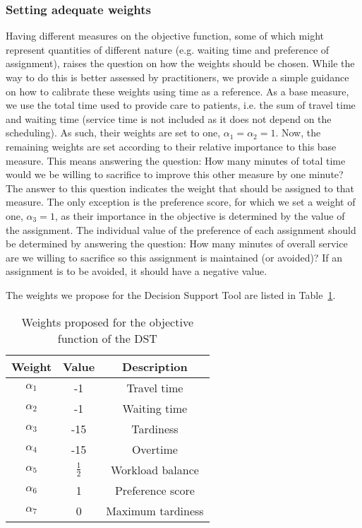 \documentclass[a4paper,11pt,authoryear]{elsarticle}
\begin{document}
\subsubsection{Setting adequate weights}
\label{subsub:adequateweights}
\noindent Having different measures on the objective function, some of which might represent quantities of different nature (e.g. waiting time and preference of assignment), raises the question on how the weights should be chosen. While the way to do this is better assessed by practitioners, we provide a simple guidance on how to calibrate these weights using time as a reference.
As a base measure, we use the total time used to provide care to patients, i.e. the sum of travel time and waiting time (service time is not included as it does not depend on the scheduling). As such, their weights are set to one, $\alpha_1 = \alpha_2 = 1$.
Now, the remaining weights are set according to their relative importance to this base measure. This means answering the question: How many minutes of total time would we be willing to sacrifice to improve this other measure by one minute? The answer to this question indicates the weight that should be assigned to that measure.
The only exception is the preference score, for which we set a weight of one, $\alpha_3 = 1$, as their importance in the objective is determined by the value of the assignment. The individual value of the preference of each assignment should be determined by answering the question: How many minutes of overall service are we willing to sacrifice so this assignment is maintained (or avoided)? If an assignment is to be avoided, it should have a negative value.

The weights we propose for the Decision Support Tool are listed in Table~\ref{table:adequateweights}.

\begin{table}[htbp!]
    \centering
    \caption{Weights proposed for the objective function of the DST}
    \begin{tabular}{ccc}
    \toprule
    \textbf{Weight}  & \textbf{Value} & \textbf{Description} \\
    \midrule
    $\alpha_1$      &   -1   &   Travel time \\
    $\alpha_2$      &   -1   &   Waiting time \\
    $\alpha_3$      &   -15   &   Tardiness \\
    $\alpha_4$      &   -15   &   Overtime \\   
    $\alpha_5$      &   $\frac{1}{2}$   &   Workload balance \\       
    $\alpha_6$      &   1   &   Preference score \\    
    $\alpha_7$      &   0   &   Maximum tardiness\\    
    \bottomrule
    \end{tabular}
    \label{table:adequateweights}
\end{table}
\end{document}

